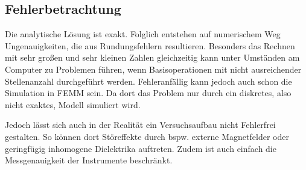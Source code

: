 \subsection*{Fehlerbetrachtung}

Die analytische Lösung ist exakt. Folglich entstehen auf numerischem Weg Ungenauigkeiten, die aus Rundungsfehlern resultieren. Besonders das Rechnen mit sehr großen und sehr kleinen Zahlen gleichzeitig kann unter Umständen am Computer zu Problemen führen, wenn Basisoperationen mit nicht ausreichender Stellenanzahl durchgeführt werden. Fehleranfällig kann jedoch auch schon die Simulation in FEMM sein. Da dort das Problem nur durch ein diskretes, also nicht exaktes, Modell simuliert wird.

Jedoch lässt sich auch in der Realität ein Versuchsaufbau nicht Fehlerfrei gestalten. So können dort Störeffekte durch bspw. externe Magnetfelder oder geringfügig inhomogene Dielektrika auftreten. Zudem ist auch einfach die Messgenauigkeit der Instrumente beschränkt. 